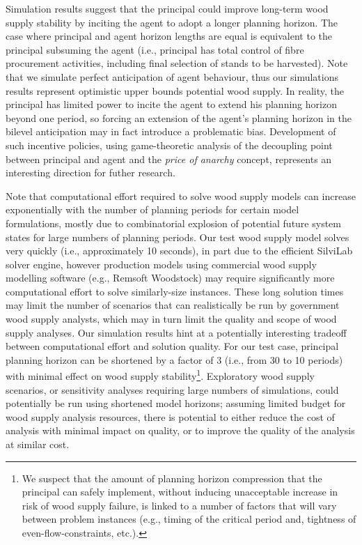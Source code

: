 Simulation results suggest that the principal could improve long-term wood supply stability by inciting the agent to adopt a longer planning horizon. The case where principal and agent horizon lengths are equal is equivalent to the principal subsuming the agent (i.e., principal has total control of fibre procurement activities, including final selection of stands to be harvested). Note that we simulate perfect anticipation of agent behaviour, thus our simulations results represent optimistic upper bounds potential wood supply. In reality, the principal has limited power to incite the agent to extend his planning horizon beyond one period, so forcing an extension of the agent's planning horizon in the bilevel anticipation may in fact introduce a problematic bias. Development of such incentive policies, using game-theoretic analysis of the decoupling point between principal and agent and the \emph{price of anarchy} concept, represents an interesting direction for futher research.

Note that computational effort required to solve wood supply models can increase exponentially with the number of planning periods for certain model formulations, mostly due to combinatorial explosion of potential future system states for large numbers of planning periods. Our test wood supply model solves very quickly (i.e., approximately 10 seconds), in part due to the efficient SilviLab solver engine, however production models using commercial wood supply modelling software (e.g., Remsoft Woodstock) may require significantly more computational effort to solve similarly-size instances. These long solution times may limit the number of scenarios that can realistically be run by government wood supply analysts, which may in turn limit the quality and scope of wood supply analyses. Our simulation results hint at a potentially interesting tradeoff between computational effort and solution quality. For our test case, principal planning horizon can be shortened by a factor of 3 (i.e., from 30 to 10 periods) with minimal effect on wood supply stability\footnote{We suspect that the amount of planning horizon compression that the principal can safely implement, without inducing unacceptable increase in risk of wood supply failure, is linked to a number of factors that will vary between problem instances (e.g., timing of the critical period and, tightness of even-flow-constraints, etc.).}. Exploratory wood supply scenarios, or sensitivity analyses requiring large numbers of simulations, could potentially be run using shortened model horizons; assuming limited budget for wood supply analysis resources, there is potential to either reduce the cost of analysis with minimal impact on quality, or to improve the quality of the analysis at similar cost.  

